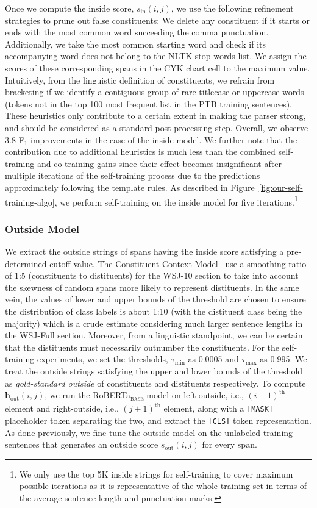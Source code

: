 \documentclass[11pt]{article}
\newcommand{\ptb}{\textsc{PTB}}
\newcommand{\roberta}{RoBERTa}
\begin{document}
Once we compute the inside score, $s_{\text{in}}{(i,j)}$, we use the following refinement strategies to prune out false constituents:
We delete any constituent if it starts or ends with the most common word succeeding the comma punctuation.
Additionally, we take the most common starting word and check if its accompanying word does not belong to the NLTK stop words list. We assign the scores of these corresponding spans in the CYK chart cell to the maximum value. Intuitively, from the linguistic definition of constituents, we refrain from bracketing if we identify a contiguous group of rare titlecase or uppercase words (tokens not in the top 100 most frequent list in the \ptb{} training sentences).
These heuristics only contribute to a certain extent in making the parser strong, and should be considered as a standard post-processing step. Overall, we observe 3.8 F$_1$ improvements in the case of the inside model. We further note that the contribution due to additional heuristics is much less than the combined self-training and co-training gains since their effect becomes insignificant after multiple iterations of the self-training process due to the predictions approximately following the template rules.
As described in Figure~\ref{fig:our-self-training-algo}, we perform self-training on the inside model for five iterations.\footnote{We only use the top 5K inside strings for self-training to cover maximum possible iterations as it is representative of the whole training set in terms of the average sentence length and punctuation marks.}

\subsubsection{Outside Model}
\label{ssec:outside-model-prepare}
We extract the outside strings of spans having the inside score satisfying a pre-determined cutoff value.  The Constituent-Context Model~\citep{klein-manning-2002-generative} use a smoothing ratio of 1:5 (constituents to distituents) for the WSJ-10 section to take into account the skewness of random spans more likely to represent distituents. In the same vein, the values of lower and upper bounds of the threshold are chosen to ensure the distribution of class labels is about 1:10 (with the distituent class being the majority) which is a crude estimate considering much larger sentence lengths in the WSJ-Full section.
Moreover, from a linguistic standpoint, we can be certain that the distituents must necessarily outnumber the constituents. For the self-training experiments, we set the thresholds, $\tau_{\text{min}}$ as 0.0005 and $\tau_{\text{max}}$ as 0.995. We treat the outside strings satisfying the upper and lower bounds of the threshold as \emph{gold-standard outside} of constituents and distituents respectively. To compute $\boldsymbol{h}_{\text{out}}{(i, j)}$, we run the \roberta{}\textsubscript{\textsc{base}} model on left-outside, i.e., ${(i-1)}^{\text{th}}$ element and right-outside, i.e., ${(j+1)}^{\text{th}}$ element, along with a \texttt{[MASK]} placeholder token separating the two, and extract the \texttt{[CLS]} token representation. As done previously, we fine-tune the outside model on the unlabeled training sentences that generates an outside score $s_{\text{out}}{(i,j)}$ for every span.
\end{document}
